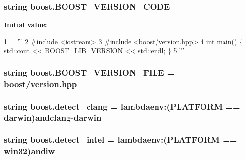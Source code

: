 \subsubsection[{\texorpdfstring{B\+O\+O\+S\+T\+\_\+\+V\+E\+R\+S\+I\+O\+N\+\_\+\+C\+O\+DE}{BOOST_VERSION_CODE}}]{\setlength{\rightskip}{0pt plus 5cm}string boost.\+B\+O\+O\+S\+T\+\_\+\+V\+E\+R\+S\+I\+O\+N\+\_\+\+C\+O\+DE}\hypertarget{namespaceboost_a3f4351660d1637a10003c2ae5e2991a5}{}\label{namespaceboost_a3f4351660d1637a10003c2ae5e2991a5}
{\bfseries Initial value\+:}
\begin{DoxyCode}
1 = \textcolor{stringliteral}{'''}
2 \textcolor{stringliteral}{#include <iostream>}
3 \textcolor{stringliteral}{#include <boost/version.hpp>}
4 \textcolor{stringliteral}{int main() \{ std::cout << BOOST\_LIB\_VERSION << std::endl; \}}
5 \textcolor{stringliteral}{'''}
\end{DoxyCode}
\subsubsection[{\texorpdfstring{B\+O\+O\+S\+T\+\_\+\+V\+E\+R\+S\+I\+O\+N\+\_\+\+F\+I\+LE}{BOOST_VERSION_FILE}}]{\setlength{\rightskip}{0pt plus 5cm}string boost.\+B\+O\+O\+S\+T\+\_\+\+V\+E\+R\+S\+I\+O\+N\+\_\+\+F\+I\+LE = \textquotesingle{}boost/version.\+hpp\textquotesingle{}}\hypertarget{namespaceboost_a61f5392dfc447d8c86202ae86a5d5f71}{}\label{namespaceboost_a61f5392dfc447d8c86202ae86a5d5f71}
\subsubsection[{\texorpdfstring{detect\+\_\+clang}{detect_clang}}]{\setlength{\rightskip}{0pt plus 5cm}string boost.\+detect\+\_\+clang = lambdaenv\+:({\bf P\+L\+A\+T\+F\+O\+RM} == \textquotesingle{}darwin\textquotesingle{})and\textquotesingle{}clang-\/darwin\textquotesingle{}}\hypertarget{namespaceboost_a0cbe1180b26a0dafbf7ed633cc06805d}{}\label{namespaceboost_a0cbe1180b26a0dafbf7ed633cc06805d}
\subsubsection[{\texorpdfstring{detect\+\_\+intel}{detect_intel}}]{\setlength{\rightskip}{0pt plus 5cm}string boost.\+detect\+\_\+intel = lambdaenv\+:({\bf P\+L\+A\+T\+F\+O\+RM} == \textquotesingle{}win32\textquotesingle{})and\textquotesingle{}iw\textquotesingle{}}\hypertarget{namespaceboost_a3c273cf1e2a95daceae623bf06c266c0}{}\label{namespaceboost_a3c273cf1e2a95daceae623bf06c266c0}
